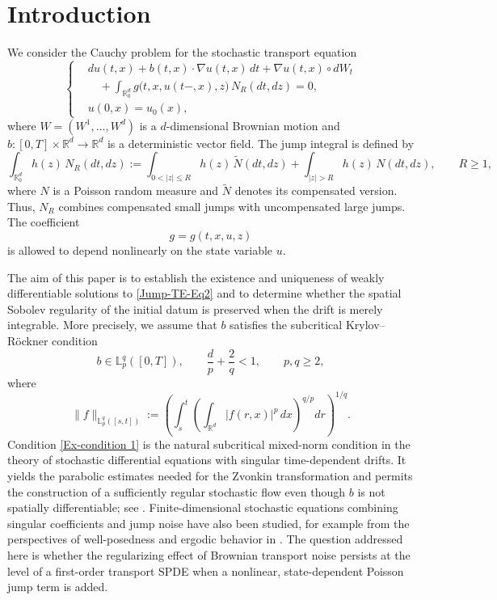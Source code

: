 \documentclass[12pt,oneside, reqno]{amsart}
\def\mL{{\mathbb L}}
\def\geq{\geqslant}
\def\leq{\leqslant}
\numberwithin{equation}{section}
\begin{document}
	
	\section{Introduction}
	
	We consider the Cauchy problem for the stochastic transport equation
	\begin{equation}\label{Jump-TE-Eq2}
		\left\{
		\begin{aligned}
			&du(t,x)
			+b(t,x)\cdot\nabla u(t,x)\,dt
			+\nabla u(t,x)\circ dW_t \\
			&\quad
			+\int_{\mathbb{R}_0^d}
			g\bigl(t,x,u(t-,x),z\bigr)\,N_R(dt,dz)
			=0,
			\\
			& u(0,x)=u_0(x),
		\end{aligned}
		\right.
	\end{equation}
	where \(W=(W^1,\ldots,W^d)\) is a \(d\)-dimensional Brownian motion and	\(b:[0,T]\times\mathbb{R}^d\to\mathbb{R}^d\) is a deterministic vector	field. The jump integral is defined by
	\begin{equation}\label{definition-NR}
		\int_{\mathbb{R}_0^d}h(z)\,N_R(dt,dz)
		:=
		\int_{0<|z|\leq R}h(z)\,\widetilde N(dt,dz)
		+
		\int_{|z|>R}h(z)\,N(dt,dz),
		\qquad R\geq1,
	\end{equation}
	where \(N\) is a Poisson random measure and \(\widetilde N\) denotes its	compensated version. Thus, \(N_R\) combines compensated small jumps with	uncompensated large jumps. The coefficient
	\[
	g=g(t,x,u,z)
	\]
	is allowed to depend nonlinearly on the state variable \(u\).
	
	The aim of this paper is to establish the existence and uniqueness of	weakly differentiable solutions to \eqref{Jump-TE-Eq2} and to determine	whether the spatial Sobolev regularity of the initial datum is preserved	when the drift is merely integrable. More precisely, we assume that	\(b\) satisfies the subcritical Krylov--R\"ockner condition
	\begin{equation}\label{Ex-condition 1}
		b\in\mL_p^q([0,T]),
		\qquad
		\frac{d}{p}+\frac{2}{q}<1,
		\qquad
		p,q\geq2,
	\end{equation}
	where
	\begin{equation*}
		\|f\|_{\mL_p^q([s,t])}
		:=
		\left(
		\int_s^t
		\left(
		\int_{\mathbb{R}^d}|f(r,x)|^p\,dx
		\right)^{q/p}dr
		\right)^{1/q}.
	\end{equation*}
	Condition \eqref{Ex-condition 1} is the natural subcritical mixed-norm	condition in the theory of stochastic differential equations with	singular time-dependent drifts. It yields the parabolic estimates needed	for the Zvonkin transformation and permits the construction of a	sufficiently regular stochastic flow even though \(b\) is not spatially	differentiable; see \cite{KrylovRockner2005}. Finite-dimensional	stochastic equations combining singular coefficients and jump noise have	also been studied, for example from the perspectives of well-posedness	and ergodic behavior in \cite{XieZhang2020}. The question addressed here	is whether the regularizing effect of Brownian transport noise persists	at the level of a first-order transport SPDE when a nonlinear,	state-dependent Poisson jump term is added.
	
\end{document}
